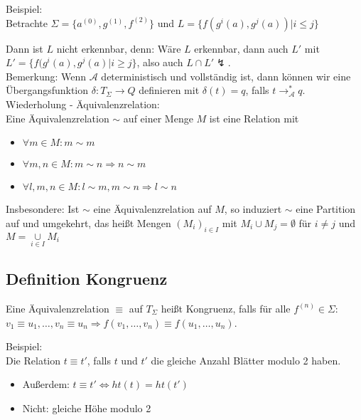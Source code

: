 \documentclass[titlepage]{article}
\begin{document}
Beispiel:\\

Betrachte $\Sigma = \{ a^{(0)}, g^{(1)}, f^{(2)}\}$ und 
$L = \{ f(g^i(a),g^j(a)) | i \leq j \}$

Dann ist $L$ nicht erkennbar, denn: W\"are $L$ erkennbar, dann auch $L'$ mit 
$L' = \{ f(g^i(a), g^j(a) | i \geq j \}$, 
also auch $L \cap L' \lightning$. \\

Bemerkung: Wenn $\mathcal{A}$ deterministisch und vollst\"andig ist, 
dann k\"onnen wir eine \"Ubergangsfunktion 
$\delta: T_\Sigma \rightarrow Q$ definieren mit $\delta (t) = q$, falls 
$t \rightarrow_\mathcal{A}^\ast q$.\\

Wiederholung - \"Aquivalenzrelation:\\

Eine \"Aquivalenzrelation $\sim $ auf einer Menge $M$ ist eine Relation mit

\begin{itemize}
	\item $\forall m \in M: m\sim m$
	\item $\forall m, n \in M: m\sim n \Rightarrow n\sim m$
	\item $\forall l, m, n \in M: l\sim m, m\sim n \Rightarrow l\sim n$
\end{itemize}

Insbesondere: Ist $\sim $ eine \"Aquivalenzrelation auf $M$, so induziert $\sim $ eine 
Partition auf und umgekehrt, das hei\ss t Mengen 
$(M_i)_{i \in I}$ mit $M_i \cup M_j = \emptyset$ f\"ur $i \neq j$ und 
$M = \underset{i \in I}{\cup} M_i$

\subsection{Definition Kongruenz}

Eine \"Aquivalenzrelation $\equiv$ auf $T_\Sigma$ hei\ss t Kongruenz, 
falls f\"ur alle $f^{(n)} \in \Sigma$: \\

$v_1 \equiv u_1, \dots, v_n \equiv u_n \Rightarrow f(v_1, \dots, v_n) \equiv 
f(u_1, \dots, u_n)$.

Beispiel:\\
Die Relation $t \equiv t'$, falls $t$ und $t'$ die gleiche Anzahl Bl\"atter modulo 2 haben.

\begin{itemize}
	\item Au\ss erdem: $t \equiv t' \Leftrightarrow ht(t) = ht(t')$
	\item Nicht: gleiche H\"ohe modulo 2
\end{itemize}
\end{document}
